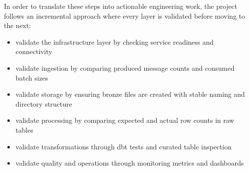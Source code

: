 In order to translate these steps into actionable engineering work, the project follows an incremental approach where every layer is validated before moving to the next:
\begin{itemize}
    \item validate the infrastructure layer by checking service readiness and connectivity
    \item validate ingestion by comparing produced message counts and consumed batch sizes
    \item validate storage by ensuring bronze files are created with stable naming and directory structure
    \item validate processing by comparing expected and actual row counts in raw tables
    \item validate transformations through dbt tests and curated table inspection
    \item validate quality and operations through monitoring metrics and dashboards
\end{itemize}

